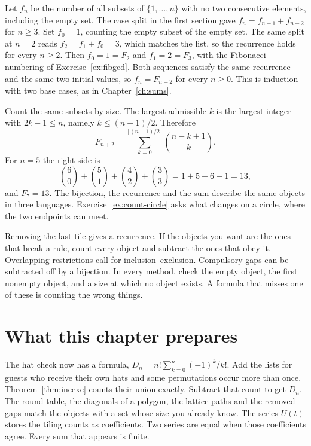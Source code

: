 Let $f_n$ be the number of all subsets of $\{1,\dots,n\}$ with no two consecutive elements, including the empty set. The case split in the first section gave $f_n=f_{n-1}+f_{n-2}$ for $n\ge 3$. Set $f_0=1$, counting the empty subset of the empty set. The same split at $n=2$ reads $f_2=f_1+f_0=3$, which matches the list, so the recurrence holds for every $n\ge 2$. Then $f_0=1=F_2$ and $f_1=2=F_3$, with the Fibonacci numbering of Exercise~\ref{ex:fibgcd}. Both sequences satisfy the same recurrence and the same two initial values, so $f_n=F_{n+2}$ for every $n\ge 0$. This is induction with two base cases, as in Chapter~\ref{ch:sums}.

Count the same subsets by size. The largest admissible $k$ is the largest integer with $2k-1\le n$, namely $k\le (n+1)/2$. Therefore
\[
F_{n+2}=\sum_{k=0}^{\lfloor(n+1)/2\rfloor}\binom{n-k+1}{k}.
\]
For $n=5$ the right side is
\[
\binom60+\binom51+\binom42+\binom33=1+5+6+1=13,
\]
and $F_7=13$. The bijection, the recurrence and the sum describe the same objects in three languages. Exercise~\ref{ex:count-circle} asks what changes on a circle, where the two endpoints can meet.

\begin{reminder}
Removing the last tile gives a recurrence. If the objects you want are the ones that break a rule, count every object and subtract the ones that obey it. Overlapping restrictions call for inclusion--exclusion. Compulsory gaps can be subtracted off by a bijection. In every method, check the empty object, the first nonempty object, and a size at which no object exists. A formula that misses one of these is counting the wrong things.
\end{reminder}

\section*{What this chapter prepares}
The hat check now has a formula, $D_n=n!\sum_{k=0}^n(-1)^k/k!$. Add the lists for guests who receive their own hats and some permutations occur more than once. Theorem~\ref{thm:incexc} counts their union exactly. Subtract that count to get $D_n$. The round table, the diagonals of a polygon, the lattice paths and the removed gaps match the objects with a set whose size you already know. The series $U(t)$ stores the tiling counts as coefficients. Two series are equal when those coefficients agree. Every sum that appears is finite.

